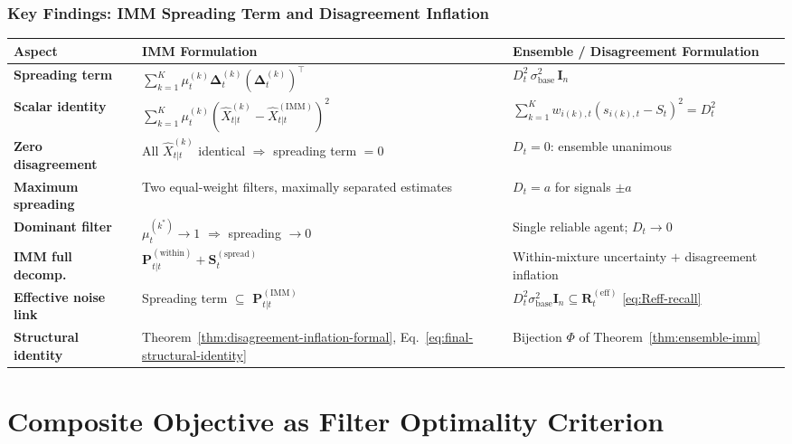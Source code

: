 \documentclass[12pt,openany]{book}
\numberwithin{equation}{chapter}
\theoremstyle{plain}
\theoremstyle{definition}
\theoremstyle{remark}
\begin{document}
\subsection{Key Findings: IMM Spreading Term and Disagreement
Inflation}

\begin{center}
\begin{tabularx}{\linewidth}{%
  >{\bfseries}p{3.0cm}
  >{\raggedright\arraybackslash}X
  >{\raggedright\arraybackslash}X}
\toprule
\textbf{Aspect} &
\textbf{IMM Formulation} &
\textbf{Ensemble / Disagreement Formulation} \\
\midrule
Spreading term &
$\displaystyle\sum_{k=1}^{K}\mu_t^{(k)}
  \boldsymbol{\Delta}_t^{(k)}
  (\boldsymbol{\Delta}_t^{(k)})^\top$ &
$D_t^2\,\sigma_{\mathrm{base}}^2\,\mathbf{I}_n$ \\[6pt]
Scalar identity &
$\displaystyle\sum_{k=1}^{K}\mu_t^{(k)}
  (\hat{X}_{t|t}^{(k)} - \hat{X}_{t|t}^{(\mathrm{IMM})})^2$ &
$\displaystyle\sum_{k=1}^{K}w_{i(k),t}
  (s_{i(k),t} - S_t)^2 = D_t^2$ \\[6pt]
Zero disagreement &
All $\hat{X}_{t|t}^{(k)}$ identical
$\Rightarrow$ spreading term $= 0$ &
$D_t = 0$: ensemble unanimous \\[6pt]
Maximum spreading &
Two equal-weight filters,
maximally separated estimates &
$D_t = a$ for signals $\pm a$ \\[6pt]
Dominant filter &
$\mu_t^{(k^*)}\to 1$
$\Rightarrow$ spreading $\to 0$ &
Single reliable agent; $D_t \to 0$ \\[6pt]
IMM full decomp. &
$\mathbf{P}_{t|t}^{(\mathrm{within})}
 + \mathbf{S}_t^{(\mathrm{spread})}$ &
Within-mixture uncertainty
$+$ disagreement inflation \\[6pt]
Effective noise link &
Spreading term $\subseteq$
$\mathbf{P}_{t|t}^{(\mathrm{IMM})}$ &
$D_t^2\sigma_{\mathrm{base}}^2\mathbf{I}_n
 \subseteq \mathbf{R}_t^{(\mathrm{eff})}$
\eqref{eq:Reff-recall} \\[6pt]
Structural identity &
Theorem~\ref{thm:disagreement-inflation-formal},
Eq.~\eqref{eq:final-structural-identity} &
Bijection $\Phi$ of
Theorem~\ref{thm:ensemble-imm} \\
\bottomrule
\end{tabularx}
\end{center}

\chapter{Composite Objective as Filter Optimality Criterion}
\label{ch:objective}
\end{document}
